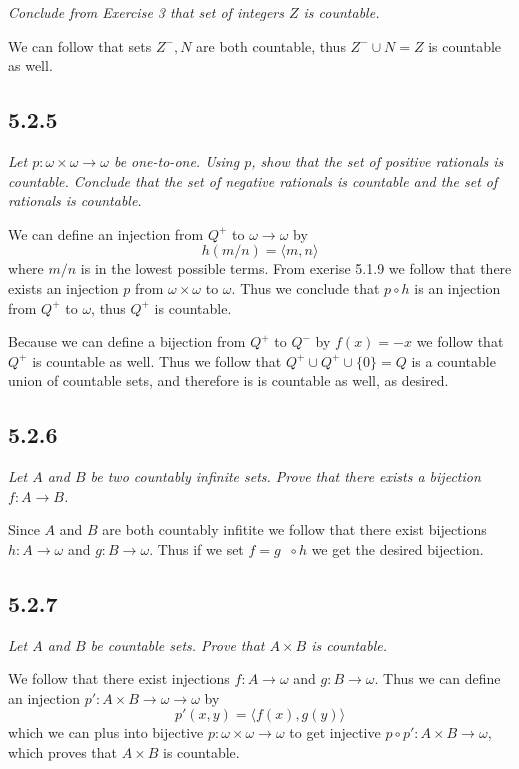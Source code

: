 \documentclass[11pt,oneside,titlepage]{book}
\DeclareMathOperator \inv {^{-1}}
\newcommand{\eangle}[1]{\langle #1 \rangle}
\begin{document}
\textit{Conclude from Exercise 3 that set of integers $Z$ is countable.}

We can follow that sets $Z^-, N$ are both countable, thus $Z^- \cup N = Z$ is countable as well.

\subsection*{5.2.5}

\textit{Let $p: \omega \times \omega \to \omega$ be one-to-one. Using $p$, show that
  the set of positive rationals is countable. Conclude that the set of negative rationals
  is countable and the set of rationals is countable.}

We can define an injection from $Q^+$ to $\omega \to \omega$ by
$$h(m/n) = \eangle{m, n}$$
where $m/n$ is in the lowest possible terms.
From exerise 5.1.9 we follow that there exists an injection $p$ from $\omega \times \omega$
to $\omega$. Thus we conclude that $p \circ h$ is an injection from $Q^+$ to $\omega$, thus
$Q^+$ is countable.

Because we can define a bijection from $Q^+$ to $Q^-$ by $f(x) = -x$ we follow that $Q^+$
is countable as well. Thus we follow that $Q^+ \cup Q^+ \cup \{0\} = Q$ is a countable union
of countable sets, and therefore is is countable as well, as desired.

\subsection*{5.2.6}

\textit{Let $A$ and $B$ be two countably infinite sets. Prove that there exists a bijection
  $f: A \to B$.}

Since $A$ and $B$ are both countably infitite we follow that there exist bijections
$h: A \to \omega$ and $g: B \to \omega$. Thus if we set
$f = g\inv \circ h $ we get the desired bijection.

\subsection*{5.2.7}

\textit{Let $A$ and $B$ be countable sets. Prove that $A \times B$ is countable.}

We follow that there exist injections $f: A \to \omega$ and $g: B \to \omega$. Thus
we can define an injection $p': A \times B \to \omega \to \omega$ by
$$p'(x, y) = \eangle{f(x), g(y)}$$
which we can plus into bijective $p: \omega \times \omega \to \omega$ to get injective
$p \circ p': A \times B \to \omega$, which proves that $A \times B$ is countable.
\end{document}
